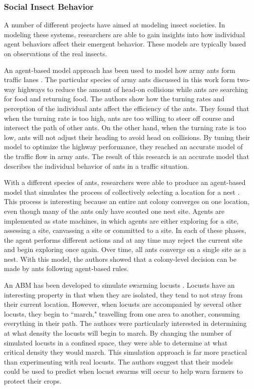 \subsubsection{Social Insect Behavior}

A number of different projects have aimed at modeling insect societies.
In modeling these systems, researchers are able to gain insights into how individual agent behaviors affect their emergent behavior.
These models are typically based on observations of the real insects.

An agent-based model approach has been used to model how army ants form traffic lanes \cite{couzin2003sol}.
The particular species of army ants discussed in this work form two-way highways to reduce the amount of head-on collisions while ants are searching for food and returning food.
The authors show how the turning rates and perception of the individual ants affect the efficiency of the ants.
They found that when the turning rate is too high, ants are too willing to steer off course and intersect the path of other ants.
On the other hand, when the turning rate is too low, ants will not adjust their heading to avoid head on collisions.
By tuning their model to optimize the highway performance, they reached an accurate model of the traffic flow in army ants.
The result of this research is an accurate model that describes the individual behavior of ants in a traffic situation.

With a different species of ants, researchers were able to produce an agent-based model that simulates the process of collectively selecting a location for a nest \cite{pratt2005agent}.
This process is interesting because an entire ant colony converges on one location, even though many of the ants only have scouted one nest site.
Agents are implemented as state machines, in which agents are either exploring for a site, assessing a site, canvassing a site or committed to a site.
In each of these phases, the agent performs different actions and at any time may reject the current site and begin exploring once again.
Over time, all ants converge on a single site as a nest.
With this model, the authors showed that a colony-level decision can be made by ants following agent-based rules.

An ABM has been developed to simulate swarming locusts \cite{buhl2006dom}.
Locusts have an interesting property in that when they are isolated, they tend to not stray from their current location.
However, when locusts are accompanied by several other locusts, they begin to ``march," travelling from one area to another, consuming everything in their path.
The authors were particularly interested in determining at what density the locusts will begin to march.
By changing the number of simulated locusts in a confined space, they were able to determine at what critical density they would march.
This simulation approach is far more practical than experimenting with real locusts.
The authors suggest that their models could be used to predict when locust swarms will occur to help warn farmers to protect their crops.


